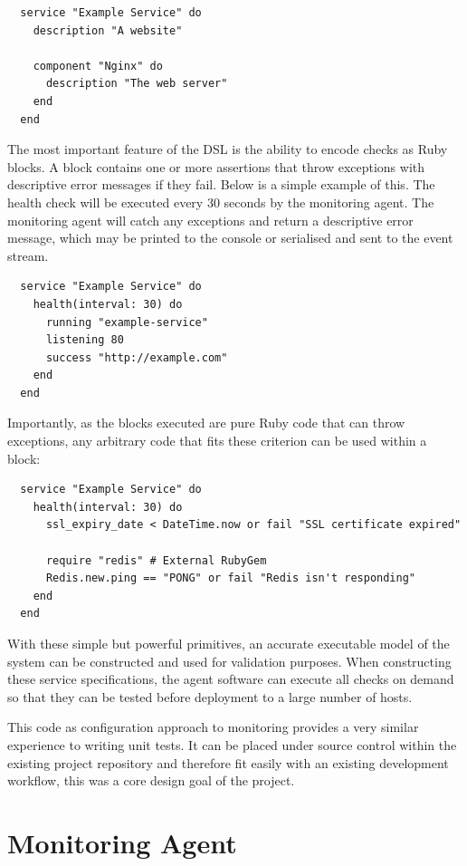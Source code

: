 \documentclass{cshonours}
\begin{document}
\begin{verbatim}
  service "Example Service" do
    description "A website"

    component "Nginx" do
      description "The web server"
    end
  end
\end{verbatim}
\label{fig:MetaProgrammingSnippet}
\pagebreak

The most important feature of the DSL is the ability to encode checks as Ruby blocks. A block contains one or more assertions that throw exceptions with descriptive error messages if they fail. Below is a simple example of this. The health check will be executed every 30 seconds by the monitoring agent. The monitoring agent will catch any exceptions and return a descriptive error message, which may be printed to the console or serialised and sent to the event stream.

\begin{verbatim}
  service "Example Service" do
    health(interval: 30) do
      running "example-service"
      listening 80
      success "http://example.com"
    end
  end
\end{verbatim}

Importantly, as the blocks executed are pure Ruby code that can throw exceptions, any arbitrary code that fits these criterion can be used within a block:

\begin{verbatim}
  service "Example Service" do
    health(interval: 30) do
      ssl_expiry_date < DateTime.now or fail "SSL certificate expired"

      require "redis" # External RubyGem
      Redis.new.ping == "PONG" or fail "Redis isn't responding"
    end
  end
\end{verbatim}

With these simple but powerful primitives, an accurate executable model of the system can be constructed and used for validation purposes. When constructing these service specifications, the agent software can execute all checks on demand so that they can be tested before deployment to a large number of hosts.

This code as configuration approach to monitoring provides a very similar experience to writing unit tests. It can be placed under source control within the existing project repository and therefore fit easily with an existing development workflow, this was a core design goal of the project.

\section{Monitoring Agent}
\end{document}

